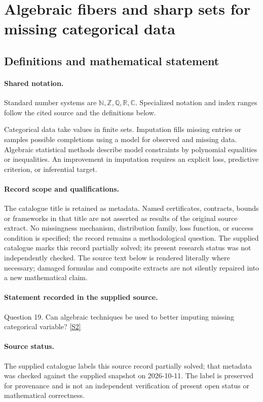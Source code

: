 \documentclass[11pt]{article}
\newcommand{\sref}[2]{\hyperlink{source:#1:#2}{[S#2]}}
\begin{document}
\section{Algebraic fibers and sharp sets for missing categorical data}\label{statement}

\subsection{Definitions and mathematical statement}

\paragraph{Shared notation.}Standard number systems are $\mathbb N,\mathbb Z,\mathbb Q,\mathbb R,\mathbb C$. Specialized notation and index ranges follow the cited source and the definitions below.


Categorical data take values in finite sets. Imputation fills missing entries or samples possible completions using a model for observed and missing data. Algebraic statistical methods describe model constraints by polynomial equalities or inequalities. An improvement in imputation requires an explicit loss, predictive criterion, or inferential target.
\paragraph{Record scope and qualifications.}
The catalogue title is retained as metadata. Named certificates, contracts, bounds or frameworks in that title are not asserted as results of the original source extract.
No missingness mechanism, distribution family, loss function, or success condition is specified; the record remains a methodological question. The supplied catalogue marks this record partially solved; its present research status was not independently checked.
The source text below is rendered literally where necessary; damaged formulas and composite extracts are not silently repaired into a new mathematical claim.
\paragraph{Statement recorded in the supplied source.}
Question 19. Can algebraic techniques be used to better imputing missing categorical variable? \sref{statement}{2}
\paragraph{Source status.}
The supplied catalogue labels this source record partially solved; that metadata was checked against the supplied snapshot on 2026-10-11. The label is preserved for provenance and is not an independent verification of present open status or mathematical correctness.
\end{document}
